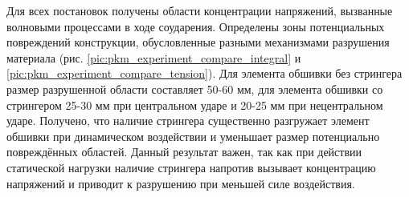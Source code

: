 Для всех постановок получены области концентрации напряжений, вызванные волновыми процессами в ходе соударения. Определены зоны потенциальных повреждений конструкции, обусловленные разными механизмами разрушения материала (рис. \ref{pic:pkm_experiment_compare_integral} и \ref{pic:pkm_experiment_compare_tension}). Для элемента обшивки без стрингера размер разрушенной области составляет 50-60 мм, для элемента обшивки со стрингером 25-30 мм при центральном ударе и 20-25 мм при нецентральном ударе. Получено, что наличие стрингера существенно разгружает элемент обшивки при динамическом воздействии и уменьшает размер потенциально повреждённых областей. Данный результат важен, так как при действии статической нагрузки наличие стрингера напротив вызывает концентрацию напряжений и приводит к разрушению при меньшей силе воздействия.

